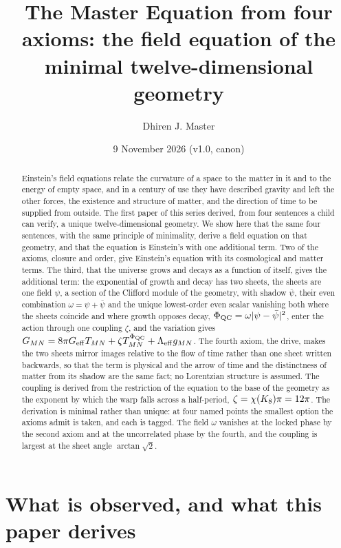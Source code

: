 \documentclass[11pt,a4paper]{article}
\title{The Master Equation from four axioms: the field equation of the minimal twelve-dimensional geometry}
\author{Dhiren J. Master}
\date{9 November 2026 (v1.0, canon)}
\theoremstyle{plain}
\theoremstyle{definition}
\theoremstyle{remark}
\begin{document}
\maketitle

\begin{abstract}
Einstein's field equations relate the curvature of a space to the matter in it and to the energy of empty space, and in a century of use they have described gravity and left the other forces, the existence and structure of matter, and the direction of time to be supplied from outside. The first paper of this series derived, from four sentences a child can verify, a unique twelve-dimensional geometry. We show here that the same four sentences, with the same principle of minimality, derive a field equation on that geometry, and that the equation is Einstein's with one additional term. Two of the axioms, closure and order, give Einstein's equation with its cosmological and matter terms. The third, that the universe grows and decays as a function of itself, gives the additional term: the exponential of growth and decay has two sheets, the sheets are one field $\psi$, a section of the Clifford module of the geometry, with shadow $\bar\psi$, their even combination $\omega=\psi+\bar\psi$ and the unique lowest-order even scalar vanishing both where the sheets coincide and where growth opposes decay, $\Phi_{\mathrm{QC}}=\omega\lvert\psi-\bar\psi\rvert^{2}$, enter the action through one coupling $\zeta$, and the variation gives $G_{MN}=8\pi G_{\mathrm{eff}}T_{MN}+\zeta T^{\Phi_{\mathrm{QC}}}_{MN}+\Lambda_{\mathrm{eff}}g_{MN}$. The fourth axiom, the drive, makes the two sheets mirror images relative to the flow of time rather than one sheet written backwards, so that the term is physical and the arrow of time and the distinctness of matter from its shadow are the same fact; no Lorentzian structure is assumed. The coupling is derived from the restriction of the equation to the base of the geometry as the exponent by which the warp falls across a half-period, $\zeta=\chi(K_8)\pi=12\pi$. The derivation is minimal rather than unique: at four named points the smallest option the axioms admit is taken, and each is tagged. The field $\omega$ vanishes at the locked phase by the second axiom and at the uncorrelated phase by the fourth, and the coupling is largest at the sheet angle $\arctan\sqrt2$.
\end{abstract}

\section{What is observed, and what this paper derives}\label{sec:intro}
\end{document}
